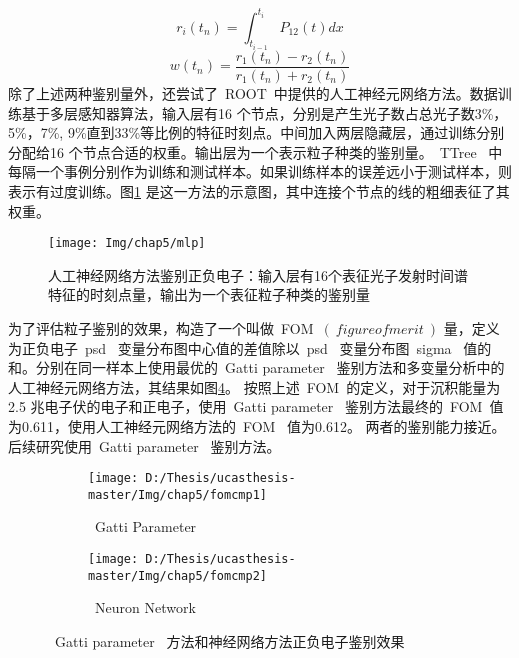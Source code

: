 \begin{equation*}
 r_{i}(t_{n})=\int_{t_{i-1}}^{t_{i}}P_{12}(t)dx
 \end{equation*}
 \begin{equation*}
 w(t_{n})=\frac{r_{1}(t_{n})-r_{2}(t_{n})}{r_{1}(t_{n})+r_{2}(t_{n})}
 \end{equation*}
除了上述两种鉴别量外，还尝试了~ROOT~中提供的人工神经元网络方法。数据训练基于多层感知器算法，输入层有16 个节点，分别是产生光子数占总光子数3\%，5\%，7\%, 9\%直到33\%等比例的特征时刻点。中间加入两层隐藏层，通过训练分别分配给16 个节点合适的权重。输出层为一个表示粒子种类的鉴别量。~TTree~ 中每隔一个事例分别作为训练和测试样本。如果训练样本的误差远小于测试样本，则表示有过度训练。图\ref{fig:p57} 是这一方法的示意图，其中连接个节点的线的粗细表征了其权重。
\begin{figure}[!htbp]
  \centering
   \texttt{[image: Img/chap5/mlp]}
    \caption{人工神经网络方法鉴别正负电子：输入层有16个表征光子发射时间谱特征的时刻点量，输出为一个表征粒子种类的鉴别量}
  \label{fig:p57}
\end{figure}
为了评估粒子鉴别的效果，构造了一个叫做~FOM~$(~figure of merit~)$ 量，定义为正负电子~psd~ 变量分布图中心值的差值除以~psd~ 变量分布图~sigma~ 值的和。分别在同一样本上使用最优的~Gatti parameter~ 鉴别方法和多变量分析中的人工神经元网络方法，其结果如图\ref{fig:p58}。 按照上述~FOM~的定义，对于沉积能量为2.5 兆电子伏的电子和正电子，使用~Gatti parameter~ 鉴别方法最终的~FOM~值为0.611，使用人工神经元网络方法的~FOM~ 值为0.612。 两者的鉴别能力接近。后续研究使用~Gatti parameter~ 鉴别方法。
\begin{figure}[!htbp]
  \centering
  \begin{subfigure}[b]{\MySubFactor\textwidth}
    \texttt{[image: D:/Thesis/ucasthesis-master/Img/chap5/fomcmp1]}
    \caption{~Gatti Parameter~}
    \label{fig:p58_1}
  \end{subfigure}%
  \quad%
  \begin{subfigure}[b]{\MySubFactor\textwidth}
    \texttt{[image: D:/Thesis/ucasthesis-master/Img/chap5/fomcmp2]}
    \caption{~Neuron Network~}
    \label{fig:p58_2}
  \end{subfigure}
    \caption{~Gatti parameter~ 方法和神经网络方法正负电子鉴别效果}
  \label{fig:p58}
\end{figure}
